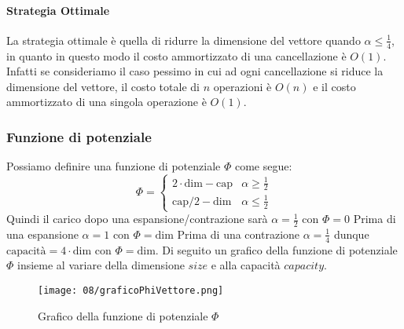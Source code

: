         \paragraph{Strategia Ottimale}
            La strategia ottimale è quella di ridurre la dimensione del vettore quando $\alpha\leq\frac{1}{4}$, in quanto in questo modo il costo ammortizzato di una cancellazione è $O(1)$. Infatti se consideriamo il caso pessimo in cui ad ogni cancellazione si riduce la dimensione del vettore, il costo totale di $n$ operazioni è $O(n)$ e il costo ammortizzato di una singola operazione è $O(1)$.
        \subsubsection{Funzione di potenziale}
            Possiamo definire una funzione di potenziale $\Phi$ come segue:
            $$
                \Phi = \begin{cases}
                    2\cdot \text{dim} - \text{cap} & \alpha\geq \frac{1}{2}\\
                    \text{cap}/2 - \text{dim} & \alpha\leq \frac{1}{2}
                \end{cases}
            $$
            Quindi il carico dopo una espansione/contrazione sarà $\alpha=\frac12$ con $\Phi=0$\newline
            Prima di una espansione $\alpha=1$ con $\Phi=\text{dim}$\newline
            Prima di una contrazione $\alpha=\frac14$ dunque $\text{capacità}=4\cdot\text{dim}$ con $\Phi=\text{dim}$.
            \newpage
            Di seguito un grafico della funzione di potenziale $\Phi$ insieme al variare della dimensione $size$ e alla capacità $capacity$.
            \begin{figure}[H]
                \centering
                \texttt{[image: 08/graficoPhiVettore.png]}
                \caption{Grafico della funzione di potenziale $\Phi$}
            \end{figure}